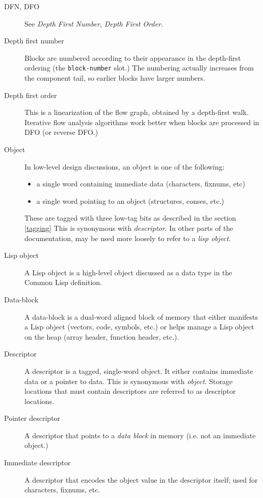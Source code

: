 \begin{description}
\item[DFN, DFO] See {\it Depth First Number}, {\it Depth First Order}.

\item[Depth first number] Blocks are numbered according to their appearance in
the depth-first ordering (the {\tt block-number} slot.)  The numbering actually
increases from the component tail, so earlier blocks have larger numbers.

\item[Depth first order] This is a linearization of the flow graph, obtained by
a depth-first walk.  Iterative flow analysis algorithms work better when blocks
are processed in DFO (or reverse DFO.)


\item[Object] In low-level design discussions, an object is one of the
following:
\begin{itemize}
\item a single word containing immediate data (characters, fixnums, etc)
\item a single word pointing to an object (structures, conses, etc.)
\end{itemize}
These are tagged with three low-tag bits as described in the section
\ref{tagging} This is synonymous with {\it descriptor}.
In other parts of the documentation, may be used more loosely to refer to a
{\it lisp object}.

\item[Lisp object]
A Lisp object is a high-level object discussed as a data type in the Common
Lisp definition.

\item[Data-block]
A data-block is a dual-word aligned block of memory that either manifests a
Lisp object (vectors, code, symbols, etc.) or helps manage a Lisp object on
the heap (array header, function header, etc.).

\item[Descriptor]
A descriptor is a tagged, single-word object.  It either contains immediate
data or a pointer to data.  This is synonymous with {\it object}.  Storage
locations that must contain descriptors are referred to as descriptor
locations.

\item[Pointer descriptor]
A descriptor that points to a {\it data block} in memory (i.e. not an immediate
object.)

\item[Immediate descriptor]
A descriptor that encodes the object value in the descriptor itself; used for
characters, fixnums, etc.


\end{description}

